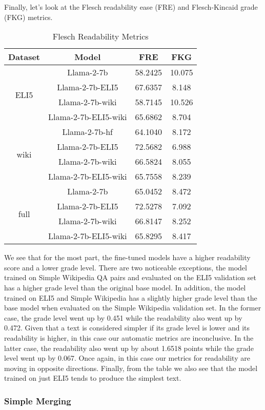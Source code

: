 \documentclass[11pt, oneside]{article}   	%
\begin{document}
Finally, let's look at the Flesch readability ease (FRE) and Flesch-Kincaid grade (FKG) metrics. 
\begin{table}[h]
\centering
\begin{tabular}{|c|c|c|c|}
\hline
\textbf{Dataset} & \textbf{Model} & \textbf{FRE} & \textbf{FKG} \\
\hline
\multirow{4}{*}{ELI5} & Llama-2-7b & 58.2425 & 10.075 \\
& Llama-2-7b-ELI5 & 67.6357 & 8.148  \\
& Llama-2-7b-wiki & 58.7145 & 10.526 \\
& Llama-2-7b-ELI5-wiki & 65.6862 &8.704  \\
\hline
\multirow{4}{*}{wiki} & Llama-2-7b-hf & 64.1040 & 8.172\\
& Llama-2-7b-ELI5 & 72.5682&6.988 \\
& Llama-2-7b-wiki & 66.5824 &8.055\\
& Llama-2-7b-ELI5-wiki & 65.7558 &8.239\\
\hline
\multirow{4}{*}{full} & Llama-2-7b & 65.0452&8.472 \\
& Llama-2-7b-ELI5 & 72.5278&7.092 \\
& Llama-2-7b-wiki & 66.8147&8.252 \\
& Llama-2-7b-ELI5-wiki & 65.8295 &8.417\\
\hline
\end{tabular}
\caption{Flesch Readability Metrics}
\end{table}
We see that for the most part, the fine-tuned models have a higher readability score and a lower grade level.
There are two noticeable exceptions, the model trained on Simple Wikipedia QA pairs and evaluated on the ELI5 validation set has a higher grade level than the original base model.
In addition, the model trained on ELI5 and Simple Wikipedia has a slightly higher grade level than the base model when evaluated on the Simple Wikipedia validation set. 
In the former case, the grade level went up by 0.451 while the readability also went up by 0.472.
Given that a text is considered simpler if its grade level is lower and its readability is higher, in this case our automatic metrics are inconclusive.
In the latter case, the readability also went up by about 1.6518 points while the grade level went up by 0.067.
Once again, in this case our metrics for readability are moving in opposite directions. 
Finally, from the table we also see that the model trained on just ELI5 tends to produce the simplest text. 


\subsubsection{Simple Merging}
\end{document}
